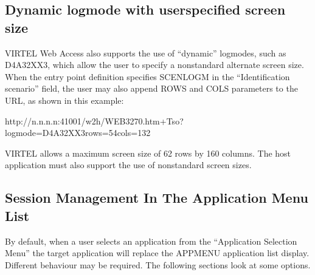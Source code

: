 \documentclass[letterpaper,10pt,english]{sphinxmanual}
\begin{document}
\ignorespaces 

\subsection{Dynamic logmode with user\sphinxhyphen{}specified screen size}
\label{\detokenize{Customization:dynamic-logmode-with-user-specified-screen-size}}\label{\detokenize{Customization:index-65}}
\sphinxAtStartPar
VIRTEL Web Access also supports the use of “dynamic” logmodes, such as D4A32XX3, which allow the user to specify a non\sphinxhyphen{}standard alternate screen size. When the entry point definition specifies SCENLOGM in the “Identification scenario” field, the user may also append ROWS and COLS parameters to the URL, as shown in this example:

\begin{sphinxVerbatim}[commandchars=\\\{\}]
http://n.n.n.n:41001/w2h/WEB3270.htm+Tso?logmode=D4A32XX3\PYGZam{}rows=54\PYGZam{}cols=132
\end{sphinxVerbatim}

\sphinxAtStartPar
VIRTEL allows a maximum screen size of 62 rows by 160 columns. The host application must also support the use of non\sphinxhyphen{}standard screen sizes.

\ignorespaces 

\subsection{Session Management In The Application Menu List}
\label{\detokenize{Customization:session-management-in-the-application-menu-list}}\label{\detokenize{Customization:index-66}}
\sphinxAtStartPar
By default, when a user selects an application from the “Application Selection Menu” the target application will replace the APPMENU application list display. Different behaviour may be required. The following sections look at some options.
\end{document}
